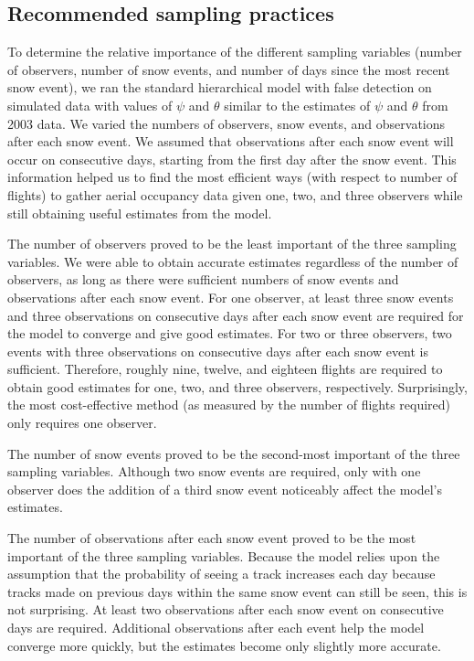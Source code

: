 \documentclass[12pt]{article}
\begin{document}
    \subsection{Recommended sampling practices}
    To determine the relative importance of the different sampling variables
    (number of observers, number of snow events, and
    number of days since the most recent snow event), we ran the standard
    hierarchical model with false detection on simulated data with values of
    \(\psi\) and
    \(\theta\) similar to the estimates of \(\psi\) and \(\theta\) from 2003
    data. We varied the numbers of observers, snow events, and observations
    after
    each snow event. We assumed that observations after each snow event will
    occur on consecutive days, starting from the first day after the snow event.
    This information helped us to find the most efficient ways (with respect to
    number of flights) to gather aerial occupancy data given one, two, and three
    observers while still obtaining useful estimates from the model.

    The number of observers proved to be the least important of the three
    sampling variables. We were able to obtain accurate estimates regardless of
    the
    number of observers, as long as there were sufficient numbers of snow events
    and observations after each snow event. For one observer, at least three
    snow events and three observations on consecutive days after each snow event
    are required for the model to converge and give good estimates. For two or
    three observers, two events with three observations on consecutive days
    after each snow event is sufficient. Therefore, roughly nine, twelve, and
    eighteen flights are required to obtain good estimates for one, two, and
    three observers, respectively. Surprisingly, the most cost-effective method
    (as measured by the number of flights required) only requires one observer.

    The number of snow events proved to be the second-most important of the
    three sampling variables. Although two snow events are required, only with
    one
    observer does the addition of a third snow event noticeably affect the
    model's estimates.

    The number of observations after each snow event proved to be the most
    important of the three sampling variables. Because the model relies upon the
    assumption that the probability of seeing a track increases each day because
    tracks made on previous days within the same snow event can still be seen,
    this is not surprising. At least two observations after each snow event on
    consecutive days are required. Additional observations after each event help
    the model converge more quickly, but the estimates become only slightly more
    accurate.
\end{document}
